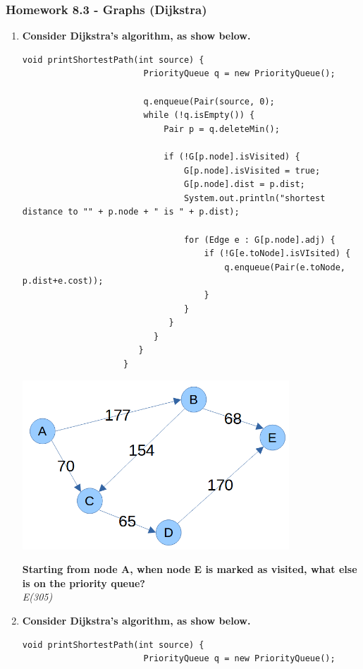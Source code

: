\documentclass[10pt]{article}
\begin{document}
\subsubsection{Homework 8.3 - Graphs (Dijkstra)}
\begin{enumerate}
    \item \textbf{Consider Dijkstra's algorithm, as show below.}
          \begin{lstlisting}[style=java]
                void printShortestPath(int source) {
                        PriorityQueue q = new PriorityQueue();
                    
                        q.enqueue(Pair(source, 0);
                        while (!q.isEmpty()) {
                            Pair p = q.deleteMin();
                    
                            if (!G[p.node].isVisited) {
                                G[p.node].isVisited = true;
                                G[p.node].dist = p.dist;
                                System.out.println("shortest distance to "" + p.node + " is " + p.dist);
                    
                                for (Edge e : G[p.node].adj) {
                                    if (!G[e.toNode].isVIsited) {
                                        q.enqueue(Pair(e.toNode, p.dist+e.cost));
                                    }
                                }
                             }
                          }
                       }
                    }
                \end{lstlisting}
          \begin{center}\includegraphics[width=10cm]{notes1 (1).png}\end{center}
          \textbf{Starting from node A, when node E is marked as visited, what else is on the priority queue?}\\
          \textit{E(305)}
    \item \textbf{Consider Dijkstra's algorithm, as show below.}\\
          \begin{lstlisting}[style=java]
                void printShortestPath(int source) {
                        PriorityQueue q = new PriorityQueue();
                    

\end{lstlisting}
\end{enumerate}
\end{document}

